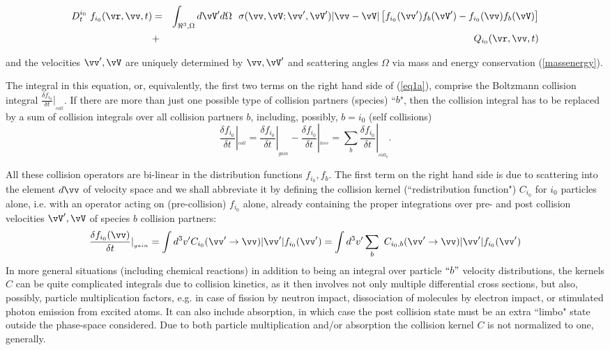 \renewcommand{\theequation}{1.1a1}
\begin{eqnarray} \label{eq1a1}\nonumber
D_t^{i_0} \ f_{i_0}(\vr,\vv,t)
& = &
\int_{\Re^3,\Omega}  d\vV'd\Omega \ \
\sigma(\vv,\vV;\vv',\vV')
|\vv-\vV| \left[f_{i_0}(\vv')
f_b(\vV')- f_{i_0}(\vv) f_b(\vV)\right]
\nonumber \\  &+  & Q_{i_0}(\vr,\vv,t)
\end{eqnarray}

\renewcommand{\theequation}{\arabic{section}.\arabic{equation}}

and the velocities $\vv',\vV $ are uniquely determined by $\vv, \vV'$ and scattering angles $\Omega$ via mass and energy conservation (\ref{massenergy}).


The integral in this equation, or, equivalently, the first two terms on the right hand side of (\ref{eq1a}), comprise the Boltzmann collision integral $\frac{\delta
f_{i_0}}{\delta t}|_{_{coll}}$. If there are more than just one possible type
of collision partners (species) ``$b$", then the collision integral has to be
replaced by a sum of collision integrals over all collision
partners $b$, including, possibly, $b=i_0$ (self collisions)
\begin{equation}\label{collop}
\frac{\delta f_{i_0}}{\delta t}|_{_{coll}}= \frac{\delta f_{i_0}}{\delta t}|_{_{gain}}- \frac{\delta f_{i_0}}{\delta t}|_{_{loss}}= \sum_b \frac{\delta f_{i_0}}{\delta
t}|_{_{coll_b}}.\end{equation}

All these collision operators are bi-linear in the distribution
functions $f_{i_0}, f_b$. The first term on the right hand side is due to
scattering into the element $d\vv$ of velocity space and
we shall abbreviate it by defining the collision kernel
(``redistribution function") $C_{i_0}$ for $i_0$ particles alone, i.e. with an operator acting on (pre-collision) $f_{i_0}$ alone, already containing the proper integrations over pre-
and post collision velocities $\vV', \vV$ of species $b$ collision partners:
\begin{equation}\label{colkern}
\frac{\delta f_{i_0}(\vv)}{\delta t}|_{_{gain}}
 =
 \int d^3{v}'  C_{i_0}(\vv' \rightarrow \vv)
|\vv'| f_{i_0}(\vv')
 =
\int d^3{v}' \sum_b \ C_{i_0,b}(\vv' \rightarrow \vv)
|\vv'| f_{i_0}(\vv')
\end{equation}
In more general situations (including chemical reactions) in addition to being an integral over particle $``b"$ velocity distributions, the kernels $C$ can be quite complicated integrals due to collision kinetics, as it then involves
not only multiple differential cross sections, but also, possibly,
particle multiplication factors, e.g. in case of fission by
neutron impact, dissociation of molecules by electron impact, or
stimulated photon emission from excited atoms. It can also
include absorption, in which case the post collision state must be
an extra ``limbo" state outside the phase-space considered. Due to
both particle multiplication and/or absorption the collision
kernel $C$ is not normalized to one, generally.

